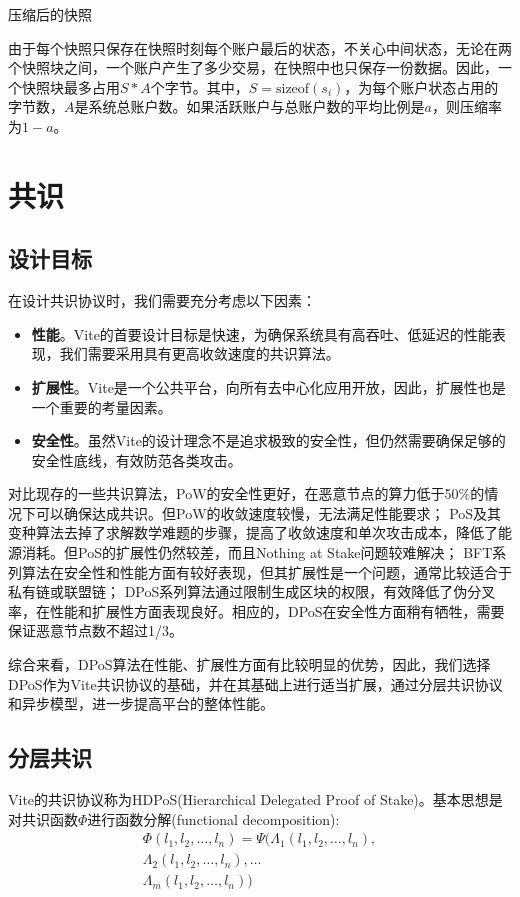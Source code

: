 \documentclass[UTF8,nofonts]{ctexart}
\makeatletter
\newenvironment{figurehere}
 {\def\@captype{figure}}
 {}
\makeatother
\begin{document}
\begin{multicols}{2}
\begin{center}
\begin{figurehere}
\begin{tikzpicture}
\end{tikzpicture}

\caption{压缩后的快照}
\label{fig:compact-snapshot}
\end{figurehere}
\end{center}

由于每个快照只保存在快照时刻每个账户最后的状态，不关心中间状态，无论在两个快照块之间，一个账户产生了多少交易，在快照中也只保存一份数据。因此，一个快照块最多占用$S * A$个字节。其中，$S = \text{sizeof}(s_{i})$，为每个账户状态占用的字节数，$A$是系统总账户数。如果活跃账户与总账户数的平均比例是$a$，则压缩率为$1-a$。

\section{共识}
\subsection{设计目标}
在设计共识协议时，我们需要充分考虑以下因素：
\begin{itemize}
	\item \textbf{性能}。Vite的首要设计目标是快速，为确保系统具有高吞吐、低延迟的性能表现，我们需要采用具有更高收敛速度的共识算法。
	\item \textbf{扩展性}。Vite是一个公共平台，向所有去中心化应用开放，因此，扩展性也是一个重要的考量因素。
	\item \textbf{安全性}。虽然Vite的设计理念不是追求极致的安全性，但仍然需要确保足够的安全性底线，有效防范各类攻击。
\end{itemize}

对比现存的一些共识算法，PoW的安全性更好，在恶意节点的算力低于50\%的情况下可以确保达成共识。但PoW的收敛速度较慢，无法满足性能要求；
PoS及其变种算法去掉了求解数学难题的步骤，提高了收敛速度和单次攻击成本，降低了能源消耗。但PoS的扩展性仍然较差，而且Nothing at Stake问题\cite{problems}较难解决；
BFT系列算法在安全性和性能方面有较好表现，但其扩展性是一个问题，通常比较适合于私有链或联盟链；
DPoS\cite{dpos}系列算法通过限制生成区块的权限，有效降低了伪分叉率，在性能和扩展性方面表现良好。相应的，DPoS在安全性方面稍有牺牲，需要保证恶意节点数不超过1/3\cite{dpos2}。

综合来看，DPoS算法在性能、扩展性方面有比较明显的优势，因此，我们选择DPoS作为Vite共识协议的基础，并在其基础上进行适当扩展，通过分层共识协议和异步模型，进一步提高平台的整体性能。

\subsection{分层共识}
Vite的共识协议称为HDPoS(Hierarchical Delegated Proof of Stake)。基本思想是对共识函数$\Phi$进行函数分解(functional decomposition):
\begin{equation}
\begin{split}
\Phi(l_1,l_2,\dots,l_n) = \Psi(\Lambda_1(l_1,l_2,\dots,l_n), \\
\Lambda_2(l_1,l_2,\dots,l_n),\dots \\
\Lambda_m(l_1,l_2,\dots,l_n))
\end{split}
\end{equation}


\end{multicols}
\end{document}
